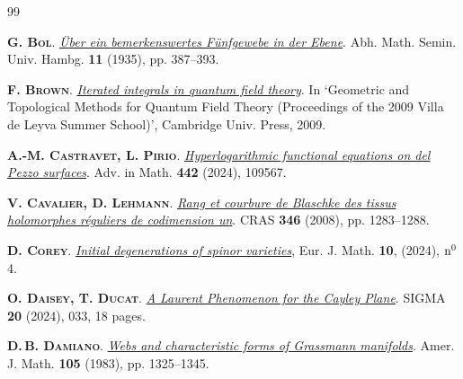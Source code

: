 \documentclass[11pt]{amsart}
\newcommand{\mk}{\medskip}
\begin{document}
\begin{thebibliography}{99}


 {\scshape \bf  G. Bol}.   
\href{https://doi.org/10.1007/BF02940735}{\it \"Uber ein bemerkenswertes F\"unfgewebe in der Ebene}. Abh. Math. Semin. Univ. Hambg. {\bf 11} 
 (1935), pp.  387--393. 
 \mk 

 {\scshape \bf  F. Brown}.   
\href{https://doi.org/10.1017/CBO9781139208642.006}{\it Iterated integrals in quantum field theory}. In `Geometric and Topological Methods for Quantum Field Theory (Proceedings of the 2009 Villa de Leyva Summer School)', Cambridge Univ. Press, 2009. 
\mk 



 {\scshape \bf  A.-M. Castravet, L. Pirio}.   
\href{https://doi.org/10.1016/j.aim.2024.109567}{\it Hyperlogarithmic functional equations on del Pezzo surfaces}.  Adv. in Math. {\bf 442} (2024),  109567.
\mk 


 {\scshape \bf  V. Cavalier, D.  Lehmann}.    
\href{https://doi.org/10.1016/j.crma.2008.10.011}{\it Rang et courbure de Blaschke des tissus holomorphes r\'eguliers de codimension un}.  CRAS {\bf 346} (2008),  
pp. 1283--1288.
\mk



{\scshape   \bf  D. Corey}. 
\href{https://doi.org/10.1007/s40879-023-00715-z}{\it Initial degenerations of spinor varieties}, {Eur. J. Math.} {\bf 10},
(2024), ${\rm n}^0$ 4. 
\mk 




{\scshape   \bf  O. Daisey, T. Ducat}. 
\href{https://doi.org/10.3842/SIGMA.2024.033}{\it A Laurent Phenomenon for the Cayley Plane}. 
	SIGMA {\bf 20} (2024), 033, 18 pages.
\mk 




{\scshape   \bf  D.\,B. Damiano}. 
\href{https://doi.org/10.2307/2374443}{\it Webs and characteristic forms of Grassmann manifolds}.  Amer. J. Math. {\bf 105} (1983),  pp. 1325--1345.
\mk 


\end{thebibliography}
\end{document}
